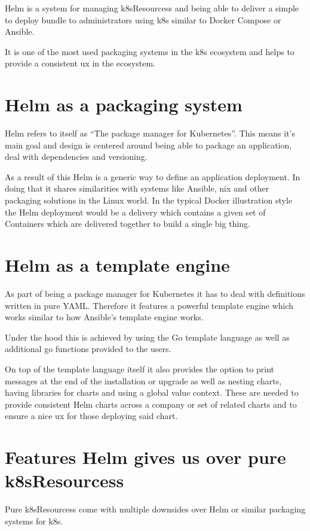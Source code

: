 Helm is a system for managing \Glspl{k8sResources} and being able to deliver a simple to deploy bundle to administrators using \Gls{k8s} similar to Docker Compose or Ansible.

It is one of the most used packaging systems in the \Gls{k8s} ecosystem and helps to provide a consistent \gls{ux} in the ecosystem.

\section{Helm as a packaging system}
Helm refers to itself as \enquote{The package manager for Kubernetes}\cite{helmauthorsHelm}.
This means it's main goal and design is centered around being able to package an application, deal with dependencies and versioning.

As a result of this Helm is a generic way to define an application deployment.
In doing that it shares similarities with systems like Ansible, nix and other packaging solutions in the Linux world. 
In the typical Docker illustration style the Helm deployment would be a delivery which contains a given set of Containers which are delivered together to build a single big thing.

\section{Helm as a template engine}
As part of being a package manager for Kubernetes it has to deal with definitions written in pure YAML.
Therefore it features a powerful template engine which works similar to how Ansible's template engine works.

Under the hood this is achieved by using the Go template language\cite{helmauthorsTemplateFunctionsPipelines,thegoauthorsTemplatePackageText} as well as additional go functions provided to the users.

On top of the template language itself it also provides the option to print messages at the end of the installation or upgrade as  well as nesting charts, having libraries for charts and using a global value context.
These are needed to provide consistent Helm charts across a company or set of related charts and to ensure a nice \gls{ux} for those deploying said chart.

\section{Features Helm gives us over pure \Glspl{k8sResources}}
Pure \Glspl{k8sResources} come with multiple downsides over Helm or similar packaging systems for \Gls{k8s}.

